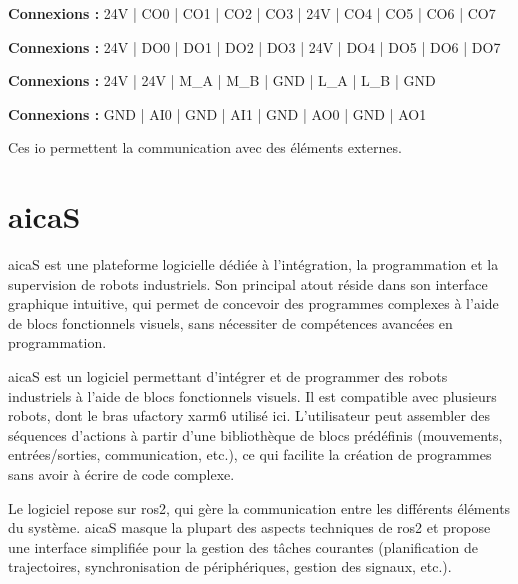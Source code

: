 \begin{tcolorbox}[colframe=black, colback=ConfigOutputColor, title=Configurable Outputs]
    \textbf{Connexions :} 24V | CO0 | CO1 | CO2 | CO3 | 24V | CO4 | CO5 | CO6 | CO7
\end{tcolorbox}

\begin{tcolorbox}[colframe=black, colback=DigitalOutputColor, title=Digital Outputs]
    \textbf{Connexions :} 24V | DO0 | DO1 | DO2 | DO3 | 24V | DO4 | DO5 | DO6 | DO7
\end{tcolorbox}

\begin{tcolorbox}[colframe=black, colback=RS485Color, title=RS485]
    \textbf{Connexions :} 24V | 24V | M\_A | M\_B | GND | L\_A | L\_B | GND
\end{tcolorbox}

\begin{tcolorbox}[colframe=black, colback=AnalogColor, title=Analog]
    \textbf{Connexions :} GND | AI0 | GND | AI1 | GND | AO0 | GND | AO1
\end{tcolorbox}

Ces \gls{io} permettent la communication avec des éléments externes.

\section{\gls{aicaS}}

\gls{aicaS} est une plateforme logicielle dédiée à l'intégration, la programmation et la supervision de robots industriels. Son principal atout réside dans son interface graphique intuitive, qui permet de concevoir des programmes complexes à l'aide de blocs fonctionnels visuels, sans nécessiter de compétences avancées en programmation.

\gls{aicaS} est un logiciel permettant d’intégrer et de programmer des robots industriels à l’aide de blocs fonctionnels visuels. Il est compatible avec plusieurs robots, dont le bras \gls{ufactory} \gls{xarm6} utilisé ici. L’utilisateur peut assembler des séquences d’actions à partir d’une bibliothèque de blocs prédéfinis (mouvements, entrées/sorties, communication, etc.), ce qui facilite la création de programmes sans avoir à écrire de code complexe.

Le logiciel repose sur \gls{ros2}, qui gère la communication entre les différents éléments du système. \gls{aicaS} masque la plupart des aspects techniques de \gls{ros2} et propose une interface simplifiée pour la gestion des tâches courantes (planification de trajectoires, synchronisation de périphériques, gestion des signaux, etc.).

